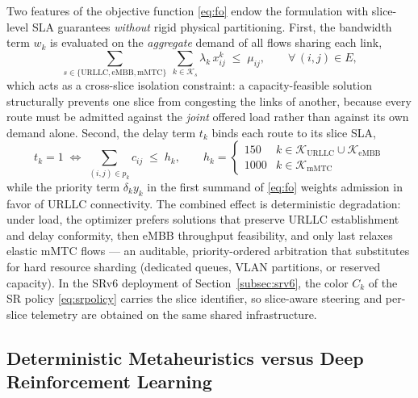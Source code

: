 Two features of the objective function \eqref{eq:fo} endow the formulation
with slice-level SLA guarantees \emph{without} rigid physical partitioning.
First, the bandwidth term $w_k$ is evaluated on the \emph{aggregate} demand of
all flows sharing each link,
\begin{equation}
\sum_{s \in \{\mathrm{URLLC},\mathrm{eMBB},\mathrm{mMTC}\}}
\ \sum_{k \in \mathcal{K}_{s}} \lambda_k\, x^{k}_{ij}
\;\le\; \mu_{ij},
\qquad \forall\,(i,j) \in E,
\label{eq:isolation}
\end{equation}
which acts as a cross-slice isolation constraint: a capacity-feasible solution
structurally prevents one slice from congesting the links of another, because
every route must be admitted against the \emph{joint} offered load rather than
against its own demand alone. Second, the delay term $t_k$ binds each route to
its slice SLA,
\begin{equation}
t_k = 1 \;\iff\; \sum_{(i,j)\in p_k} c_{ij} \;\le\; h_k,
\qquad
h_k = \begin{cases}
150 & k \in \mathcal{K}_{\mathrm{URLLC}} \cup \mathcal{K}_{\mathrm{eMBB}}\\[2pt]
1000 & k \in \mathcal{K}_{\mathrm{mMTC}}
\end{cases}
\label{eq:sliceh}
\end{equation}
while the priority term $\delta_k y_k$ in the first summand of
\eqref{eq:fo} weights admission in favor of URLLC connectivity. The combined
effect is deterministic degradation: under load, the optimizer prefers
solutions that preserve URLLC establishment and delay conformity, then eMBB
throughput feasibility, and only last relaxes elastic mMTC flows --- an
auditable, priority-ordered arbitration that substitutes for hard resource
sharding (dedicated queues, VLAN partitions, or reserved capacity). In the
SRv6 deployment of Section~\ref{subsec:srv6}, the color $C_k$ of the SR policy
\eqref{eq:srpolicy} carries the slice identifier, so slice-aware steering and
per-slice telemetry are obtained on the same shared infrastructure.

\subsection{Deterministic Metaheuristics versus Deep Reinforcement Learning}
\label{subsec:drl}

